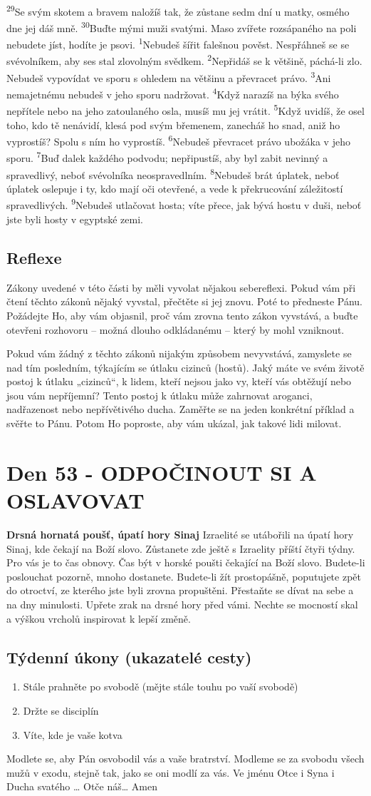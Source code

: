 \documentclass[11pt]{article}
\newcommand{\zacatekOsmyTyden}{
  \textbf{Drsná hornatá poušť, úpatí hory Sinaj} \newline 
  Izraelité se utábořili na úpatí hory Sinaj, kde čekají na Boží slovo. Zůstanete zde ještě s Izraelity příští čtyři týdny. Pro vás je to čas obnovy. Čas být v horské poušti čekající na Boží slovo. Budete-li poslouchat pozorně, mnoho dostanete. Budete-li žít prostopášně, poputujete zpět do otroctví, ze kterého jste byli zrovna propuštěni. Přestaňte se dívat na sebe a na dny minulosti. Upřete zrak na drsné hory před vámi. Nechte se mocností skal a výškou vrcholů inspirovat k lepší změně.
  \subsection*{Týdenní úkony (ukazatelé cesty)}
\begin{enumerate}
  \item Stále prahněte po svobodě (mějte stále touhu po vaší svobodě)
  \item Držte se disciplín
  \item Víte, kde je vaše kotva
\end{enumerate}
Modlete se, aby Pán osvobodil vás a vaše bratrství. \newline
Modleme se za svobodu všech mužů v exodu, stejně tak, jako se oni modlí za vás.\newline
Ve jménu Otce i Syna i Ducha svatého …  Otče náš… Amen
}
\begin{document}
{\textsuperscript{29}Se svým skotem a bravem naložíš tak, že zůstane sedm dní u matky, osmého dne jej dáš mně.
\textsuperscript{30}Buďte mými muži svatými. Maso zvířete rozsápaného na poli nebudete jíst, hodíte je psovi.
\textsuperscript{1}Nebudeš šířit falešnou pověst. Nespřáhneš se se svévolníkem, aby ses stal zlovolným svědkem.
\textsuperscript{2}Nepřidáš se k většině, páchá-li zlo. Nebudeš vypovídat ve sporu s ohledem na většinu a převracet právo. 
\textsuperscript{3}Ani nemajetnému nebudeš v jeho sporu nadržovat.
\textsuperscript{4}Když narazíš na býka svého nepřítele nebo na jeho zatoulaného osla, musíš mu jej vrátit.
\textsuperscript{5}Když uvidíš, že osel toho, kdo tě nenávidí, klesá pod svým břemenem, zanecháš ho snad, aniž ho vyprostíš? Spolu s ním ho vyprostíš.
\textsuperscript{6}Nebudeš převracet právo ubožáka v jeho sporu.
\textsuperscript{7}Buď dalek každého podvodu; nepřipustíš, aby byl zabit nevinný a spravedlivý, neboť svévolníka neospravedlním.
\textsuperscript{8}Nebudeš brát úplatek, neboť úplatek oslepuje i ty, kdo mají oči otevřené, a vede k překrucování záležitostí spravedlivých.
\textsuperscript{9}Nebudeš utlačovat hosta; víte přece, jak bývá hostu v duši, neboť jste byli hosty v egyptské zemi.
}

\subsection*{Reflexe}
Zákony uvedené v této části by měli vyvolat nějakou sebereflexi. Pokud vám při čtení těchto zákonů nějaký
vyvstal, přečtěte si jej znovu. Poté to předneste Pánu. Požádejte Ho, aby vám objasnil, proč vám zrovna tento
zákon vyvstává, a buďte otevřeni rozhovoru – možná dlouho odkládanému – který by mohl vzniknout.

Pokud vám žádný z těchto zákonů nijakým způsobem nevyvstává, zamyslete se nad tím posledním, týkajícím
se útlaku cizinců (hostů). Jaký máte ve svém životě postoj k útlaku „cizinců“, k lidem, kteří nejsou jako vy,
kteří vás obtěžují nebo jsou vám nepříjemní? Tento postoj k útlaku může zahrnovat aroganci, nadřazenost
nebo nepřívětivého ducha. Zaměřte se na jeden konkrétní příklad a svěřte to Pánu. Potom Ho poproste, aby
vám ukázal, jak takové lidi milovat.

\newpage
\section{Den 53 - ODPOČINOUT SI A OSLAVOVAT}
\zacatekOsmyTyden
\end{document}
